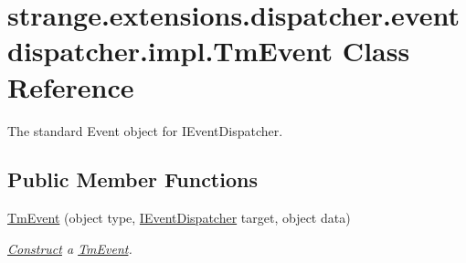 \hypertarget{classstrange_1_1extensions_1_1dispatcher_1_1eventdispatcher_1_1impl_1_1_tm_event}{\section{strange.\-extensions.\-dispatcher.\-eventdispatcher.\-impl.\-Tm\-Event Class Reference}
\label{classstrange_1_1extensions_1_1dispatcher_1_1eventdispatcher_1_1impl_1_1_tm_event}
}


The standard Event object for I\-Event\-Dispatcher.  


\subsection*{Public Member Functions}
\begin{DoxyCompactItemize}
\item 
\hypertarget{classstrange_1_1extensions_1_1dispatcher_1_1eventdispatcher_1_1impl_1_1_tm_event_a606af8e7c4e19a2c4223e493e3b35987}{\hyperlink{classstrange_1_1extensions_1_1dispatcher_1_1eventdispatcher_1_1impl_1_1_tm_event_a606af8e7c4e19a2c4223e493e3b35987}{Tm\-Event} (object type, \hyperlink{interfacestrange_1_1extensions_1_1dispatcher_1_1eventdispatcher_1_1api_1_1_i_event_dispatcher}{I\-Event\-Dispatcher} target, object data)}\label{classstrange_1_1extensions_1_1dispatcher_1_1eventdispatcher_1_1impl_1_1_tm_event_a606af8e7c4e19a2c4223e493e3b35987}

\begin{DoxyCompactList}\small\item\em \hyperlink{class_construct}{Construct} a \hyperlink{classstrange_1_1extensions_1_1dispatcher_1_1eventdispatcher_1_1impl_1_1_tm_event}{Tm\-Event}. \end{DoxyCompactList}\end{DoxyCompactItemize}
